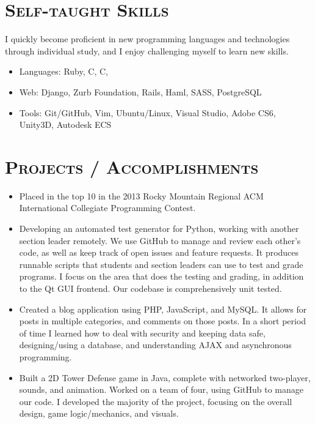 \documentclass[11pt,letterpaper]{article}
\newcommand{\CPP}
{C\nolinebreak[4]\hspace{-.05em}\raisebox{.22ex}{\footnotesize\bf ++}}
\newcommand{\CS}
{C\nolinebreak[4]\hspace{-.05em}\raisebox{.22ex}{\footnotesize\bf \#}}
\begin{document}
\begin{minipage}{\textwidth}
\section{\scshape Self-taught Skills}
\vspace{-3mm}
I quickly become proficient in new programming languages and technologies through individual study,
and I enjoy challenging myself to learn new skills.
\vspace{2mm}
\begin{itemize}
 \item Languages: Ruby, \CPP, \CS, \textls{\LaTeX}
 \item Web: Django, Zurb Foundation, Rails, Haml, SASS, PostgreSQL
 \item Tools: Git/GitHub, Vim, Ubuntu/Linux, Visual Studio, Adobe CS6, Unity3D, Autodesk ECS
\end{itemize}

\vspace{-3mm}
\section{\scshape Projects / Accomplishments}
\vspace{-3mm}

\begin{itemize}
 \item Placed in the top 10 in the 2013 Rocky Mountain Regional ACM International Collegiate Programming Contest.
 \item Developing an automated test generator for Python, working with another section leader remotely. We use GitHub to
 manage and review each other's code, as well as keep track of open issues and feature requests. It produces runnable
 scripts that students and section leaders can use to test and grade programs. I focus on the
 area that does the testing and grading, in addition to the Qt GUI frontend. Our codebase is
 comprehensively unit tested.
 \item Created a blog application using PHP, JavaScript, and MySQL. It allows for posts in
 multiple categories, and comments on those posts. In a short period of time I learned how to deal with
 security and keeping data safe, designing/using a database, and understanding AJAX and asynchronous programming.
 \item Built a 2D Tower Defense game in Java, complete with networked two-player, sounds, and animation. Worked on 
 a team of four, using GitHub to manage our code. I developed the majority of the project, focusing on the
 overall design, game logic/mechanics, and visuals.
\end{itemize}



\end{minipage}
\end{document}
